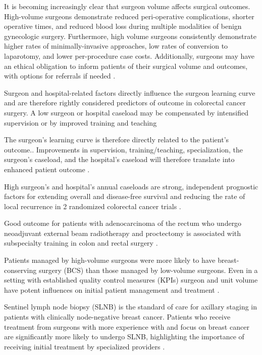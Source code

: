 It is becoming increasingly clear that surgeon volume affects surgical outcomes. High-volume surgeons demonstrate reduced peri-operative complications, shorter operative times, and reduced blood loss during multiple modalities of benign gynecologic surgery. Furthermore, high volume surgeons consistently demonstrate higher rates of minimally-invasive approaches, low rates of conversion to laparotomy, and lower per-procedure case costs. Additionally, surgeons may have an ethical obligation to inform patients of their surgical volume and outcomes, with options for referrals if needed \cite{glaser_surgeon_2019}.

Surgeon and hospital-related factors directly influence the surgeon learning curve and are therefore rightly considered predictors of outcome in colorectal cancer surgery. A low surgeon or hospital caseload may be compensated by intensified supervision or by improved training and teaching \cite{bonati_surgeon_2021}

The surgeon's learning curve is therefore directly related to the patient's outcome.. Improvements in supervision, training/teaching, specialization, the surgeon's caseload, and the hospital's caseload will therefore translate into enhanced patient outcome \cite{renzulli_learning_2005}.

High surgeon's and hospital's annual caseloads are strong, independent prognostic factors for extending overall and disease-free survival and reducing the rate of local recurrence in 2 randomized colorectal cancer trials \cite{renzulli_influence_2006}.

Good outcome for patients with adenocarcinoma of the rectum who undergo neoadjuvant external beam radiotherapy and proctectomy is associated with subspecialty training in colon and rectal surgery \cite{read_surgeon_2002}.

Patients managed by high-volume surgeons were more likely to have breast-conserving surgery (BCS) than those managed by low-volume surgeons. Even in a setting with established quality control measures (KPIs) surgeon and unit volume have potent influences on initial patient management and treatment \cite{mcdermott_surgeon_2013}.

Sentinel lymph node biopsy (SLNB) is the standard of care for axillary staging in patients with clinically node-negative breast cancer. Patients who receive treatment from surgeons with more experience with and focus on breast cancer are significantly more likely to undergo SLNB, highlighting the importance of receiving initial treatment by specialized providers \cite{yen_surgeon_2014}.

